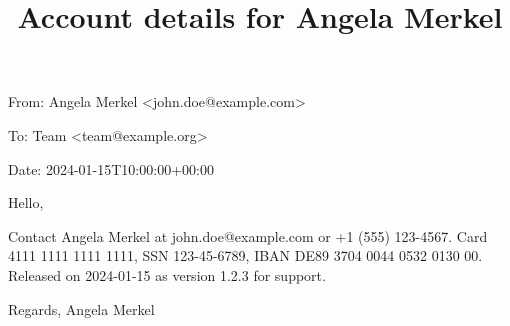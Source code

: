 \documentclass[11pt,a4paper]{article}
\title{Account details for Angela Merkel}
\begin{document}
\maketitle

From: Angela Merkel <john.doe@example.com>

To: Team <team@example.org>

Date: 2024-01-15T10:00:00+00:00

Hello,

Contact Angela Merkel at john.doe@example.com or +1 (555) 123-4567.
Card 4111 1111 1111 1111, SSN 123-45-6789, IBAN DE89 3704 0044 0532 0130 00.
Released on 2024-01-15 as version 1.2.3 for support.

Regards,
Angela Merkel
\end{document}
